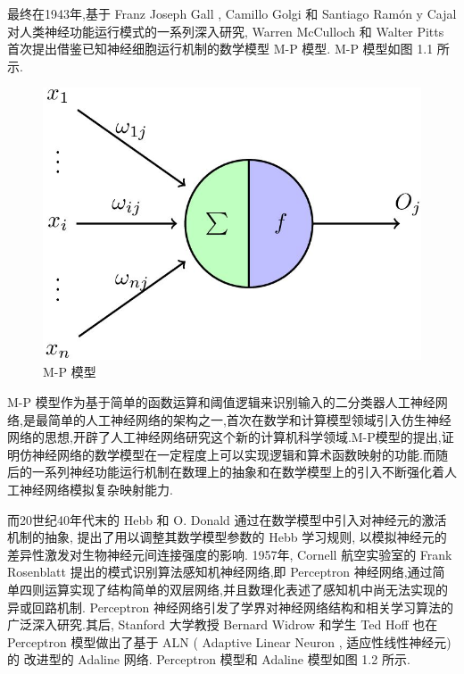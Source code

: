 最终在1943年,基于 Franz Joseph Gall , Camillo Golgi 和 Santiago Ramón y Cajal 对人类神经功能运行模式的一系列深入研究, Warren McCulloch 和 Walter Pitts 首次提出借鉴已知神经细胞运行机制的数学模型 M-P 模型. M-P 模型如图 1.1 所示.

\begin{figure}[H]
	\centering
	\includegraphics[scale=0.35]{Figures/mpmodel.png}
	\caption{M-P 模型}
\end{figure}

M-P 模型作为基于简单的函数运算和阈值逻辑来识别输入的二分类器人工神经网络,是最简单的人工神经网络的架构之一,首次在数学和计算模型领域引入仿生神经网络的思想,开辟了人工神经网络研究这个新的计算机科学领域.M-P模型的提出,证明仿神经网络的数学模型在一定程度上可以实现逻辑和算术函数映射的功能.而随后的一系列神经功能运行机制在数理上的抽象和在数学模型上的引入不断强化着人工神经网络模拟复杂映射能力.

而20世纪40年代末的 Hebb 和 O. Donald 通过在数学模型中引入对神经元的激活机制的抽象, 提出了用以调整其数学模型参数的 Hebb 学习规则, 以模拟神经元的差异性激发对生物神经元间连接强度的影响\cite{hebb}. 1957年, Cornell 航空实验室的 Frank Rosenblatt 提出的模式识别算法感知机神经网络,即 Perceptron 神经网络,通过简单四则运算实现了结构简单的双层网络,并且数理化表述了感知机中尚无法实现的异或回路机制\cite{perceptron}. Perceptron 神经网络引发了学界对神经网络结构和相关学习算法的广泛深入研究.其后, Stanford 大学教授 Bernard Widrow 和学生 Ted Hoff 也在 Perceptron 模型做出了基于 ALN ( Adaptive Linear Neuron , 适应性线性神经元)的 改进型的 Adaline 网络\cite{adaline}. Perceptron 模型和 Adaline 模型如图 1.2 所示.

